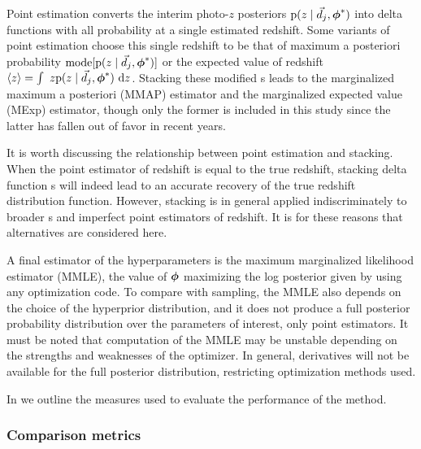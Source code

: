 Point estimation converts the interim photo-$z$ posteriors $\mathrm{p}(z \mid \vec{d}_{j}, {\boldsymbol{\phi}}^{*})$ into delta functions with all probability at a single estimated redshift.  
Some variants of point estimation choose this single redshift to be that of maximum a posteriori probability $\mathrm{mode}[\mathrm{p}(z \mid \vec{d}_{j}, {\boldsymbol{\phi}}^{*})]$ or the expected value of redshift $\langle z \rangle = \int\ z \mathrm{p}(z \mid \vec{d}_{j}, {\boldsymbol{\phi}}^{*})\ \mathrm{d} z$.
Stacking these modified \pzpdf s leads to the marginalized maximum a posteriori (MMAP) estimator and the marginalized expected value (MExp) estimator, though only the former is included in this study since the latter has fallen out of favor in recent years.

It is worth discussing the relationship between point estimation and stacking.  
When the point estimator of redshift is equal to the true redshift, stacking delta function \pzpdf s will indeed lead to an accurate recovery of the true redshift distribution function.  
However, stacking is in general applied indiscriminately to broader \pzpdf s and imperfect point estimators of redshift.  
It is for these reasons that alternatives are considered here.

A final estimator of the hyperparameters is the maximum marginalized likelihood estimator (MMLE), the value of ${\boldsymbol{\phi}}$ maximizing the log posterior given by  using any optimization code.  
To compare with sampling, the MMLE also depends on the choice of the hyperprior distribution, and it does not produce a full posterior probability distribution over the parameters of interest, only point estimators.  
It must be noted that computation of the MMLE may be unstable depending on the strengths and weaknesses of the optimizer.  
In general, derivatives will not be available for the full posterior distribution, restricting optimization methods used.

In  we outline the measures used to evaluate the performance of the method.

\subsubsection{Comparison metrics}

